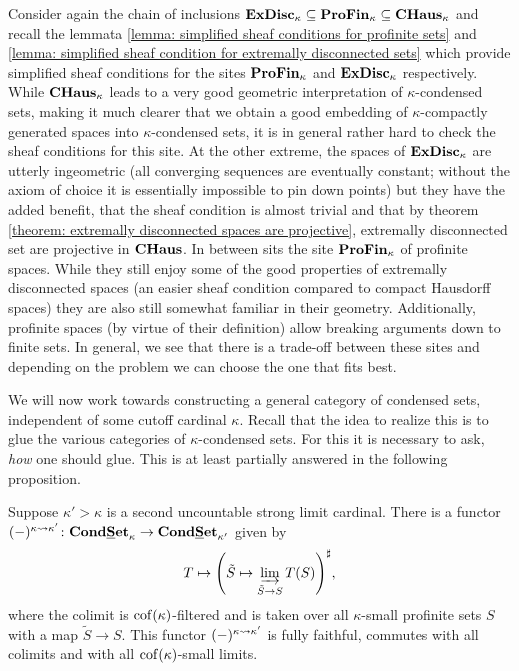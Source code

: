 \begin{remark}
	Consider again the chain of inclusions ${\mathbf{ExDisc}}_{\kappa}\subseteq {\mathbf{ProFin}}_{\kappa}\subseteq {{{\mathbf{CHaus}}}_{\kappa}}$ and recall the lemmata \ref{lemma: simplified sheaf conditions for profinite sets} and \ref{lemma: simplified sheaf condition for extremally disconnected sets} which provide simplified sheaf conditions for the sites ${\mathbf{ProFin}}_{\kappa}$ and ${\mathbf{ExDisc}}_{\kappa}$ respectively. While ${{{\mathbf{CHaus}}}_{\kappa}}$ leads to a very good geometric interpretation of $\kappa$-condensed sets, making it much clearer that we obtain a good embedding of $\kappa$-compactly generated spaces into $\kappa$-condensed sets, it is in general rather hard to check the sheaf conditions for this site. At the other extreme, the spaces of ${\mathbf{ExDisc}}_{\kappa}$ are utterly ingeometric (all converging sequences are eventually constant; without the axiom of choice it is essentially impossible to pin down points) but they have the added benefit, that the sheaf condition is almost trivial and that by theorem \ref{theorem: extremally disconnected spaces are projective}, extremally disconnected set are projective in ${{\mathbf{CHaus}}}$. In between sits the site ${\mathbf{ProFin}}_{\kappa}$ of profinite spaces. While they still enjoy some of the good properties of extremally disconnected spaces (\eg an easier sheaf condition compared to compact Hausdorff spaces) they are also still somewhat familiar in their geometry. Additionally, profinite spaces (by virtue of their definition) allow breaking arguments down to finite sets. In general, we see that there is a trade-off between these sites and depending on the problem we can choose the one that fits best.
\end{remark}

We will now work towards constructing a general category of condensed sets, independent of some cutoff cardinal $\kappa$. Recall that the idea to realize this is to glue the various categories of $\kappa$-condensed sets. For this it is necessary to ask, \emph{how} one should glue. This is at least partially answered in the following proposition.
\begin{proposition}
	\label{proposition: transitioning between different cardinals}
	
	Suppose $\kappa' > \kappa$ is a second uncountable strong limit cardinal. There is a functor $(-)^{\kappa\rightsquigarrow \kappa'}\colon {{{\mathbf{Cond}}}{{\mathbf{\underline{S}et}}}_{\kappa}} \to {{{\mathbf{Cond}}}{{\mathbf{\underline{S}et}}}_{\kappa'}}$ given by
		$$T \mapsto \sheafification{\tilde S\mapsto \colimit_{\tilde S\to S} T(S)},$$
	where the colimit is ${\operatorname{cof}(\kappa)}$-filtered and is taken over all $\kappa$-small profinite sets $S$ with a map $\tilde S\to S$. This functor $(-)^{\kappa\rightsquigarrow \kappa'}$ is fully faithful, commutes with all colimits and with all ${\operatorname{cof}(\kappa)}$-small limits.
\end{proposition}

